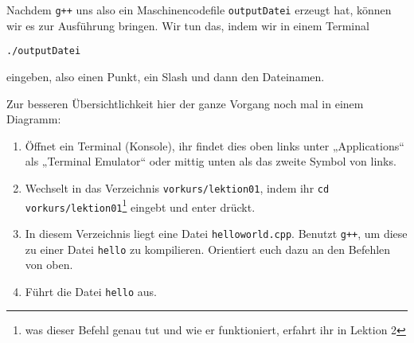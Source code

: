 Nachdem \texttt{g++} uns also ein Maschinencodefile \texttt{outputDatei}
erzeugt hat, können wir es zur Ausführung bringen. Wir tun das, indem wir in
einem Terminal
\begin{center}
    \texttt{./outputDatei}
\end{center}
eingeben, also einen Punkt, ein Slash und dann den Dateinamen.

Zur besseren Übersichtlichkeit hier der ganze Vorgang noch mal in einem
Diagramm:

\begin{center}
\end{center}

\begin{praxis}
    \begin{enumerate}
        \item Öffnet ein Terminal (Konsole), ihr findet dies oben links unter „Applications“ als „Terminal Emulator“ oder mittig unten als das zweite Symbol von links.
        \item Wechselt in das Verzeichnis \texttt{vorkurs/lektion01}, indem ihr
              \texttt{cd vorkurs/lektion01}\footnote{was dieser Befehl genau tut und wie er funktioniert, erfahrt ihr in Lektion 2} eingebt und enter drückt.
        \item In diesem Verzeichnis liegt eine Datei \texttt{helloworld.cpp}.
              Benutzt \texttt{g++}, um diese zu einer Datei \texttt{hello} zu
              kompilieren. Orientiert euch dazu an den Befehlen von oben.
        \item Führt die Datei \texttt{hello} aus.
    \end{enumerate}
\end{praxis}

